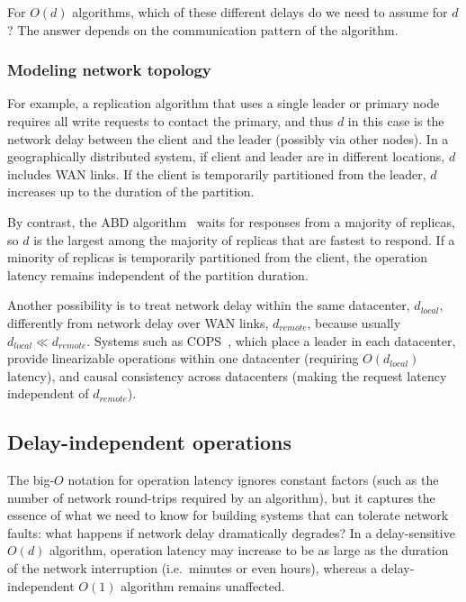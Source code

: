 \documentclass[a4paper,twocolumn,10pt]{article}
\begin{document}
For $O(d)$ algorithms, which of these different delays do we need to assume for $d$? The answer
depends on the communication pattern of the algorithm.

\subsubsection{Modeling network topology}

For example, a replication algorithm that uses a single leader or primary node requires all write
requests to contact the primary, and thus $d$ in this case is the network delay between the client
and the leader (possibly via other nodes). In a geographically distributed system, if client and
leader are in different locations, $d$ includes WAN links. If the client is temporarily partitioned
from the leader, $d$ increases up to the duration of the partition.

By contrast, the ABD algorithm~\cite{Attiya1995bm} waits for responses from a majority of replicas,
so $d$ is the largest among the majority of replicas that are fastest to respond. If a minority of
replicas is temporarily partitioned from the client, the operation latency remains independent of
the partition duration.

Another possibility is to treat network delay within the same datacenter, $d_\textit{local}$,
differently from network delay over WAN links, $d_\textit{remote}$, because usually
$d_\textit{local} \ll d_\textit{remote}$. Systems such as COPS~\cite{Lloyd2011hz}, which place a
leader in each datacenter, provide linearizable operations within one datacenter (requiring
$O(d_\textit{local})$ latency), and causal consistency across datacenters (making the request
latency independent of $d_\textit{remote}$).


\subsection{Delay-independent operations}\label{sec:disconnected}

The big-$O$ notation for operation latency ignores constant factors (such as the number of network
round-trips required by an algorithm), but it captures the essence of what we need to know for
building systems that can tolerate network faults: what happens if network delay dramatically
degrades? In a delay-sensitive $O(d)$ algorithm, operation latency may increase to be as large as
the duration of the network interruption (i.e.\ minutes or even hours), whereas a delay-independent
$O(1)$ algorithm remains unaffected.
\end{document}

